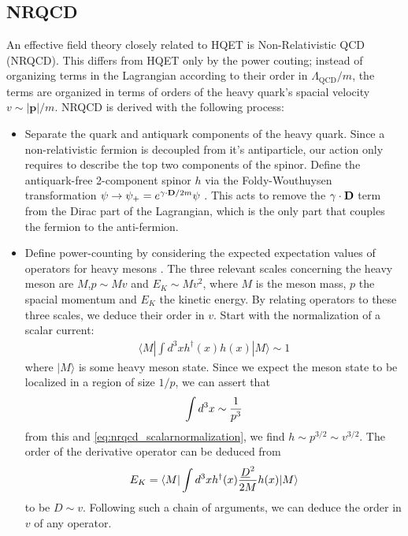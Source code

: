 \subsection{NRQCD}

An effective field theory closely related to HQET is Non-Relativistic QCD (NRQCD). This differs from HQET only by the power couting; instead of organizing terms in the Lagrangian according to their order in $\Lambda_{\text{QCD}}/m$, the terms are organized in terms of orders of the heavy quark's spacial velocity $v \sim |{\textbf{p}}|/m$. NRQCD is derived with the following process:
\begin{itemize}
\item
  Separate the quark and antiquark components of the heavy quark. Since a non-relativistic fermion is decoupled from it's antiparticle, our action only requires to describe the top two components of the spinor.
  Define the antiquark-free 2-component spinor $h$ via the Foldy-Wouthuysen transformation $\psi \to \psi_+ = e^{ {\bf{\gamma}}\cdot {\bf{D}}/2m} \psi$ \cite{PhysRev.78.29}. This acts to remove the ${\bf{\gamma}}\cdot {\bf{D}}$ term from the Dirac part of the Lagrangian, which is the only part that couples the fermion to the anti-fermion.
\item
Define power-counting by considering the expected expectation values of operators for heavy mesons \cite{Lepage:1992tx}. The three relevant scales concerning the heavy meson are $M$,$p\sim Mv$ and $E_K\sim Mv^2$, where $M$ is the meson mass, $p$ the spacial momentum and $E_K$ the kinetic energy. By relating operators to these three scales, we deduce their order in $v$. Start with the normalization of a scalar current:
\begin{align}
	\langle M | \int d^3x h^{\dagger}(x) h(x) | M \rangle \sim 1
	\label{eq:nrqcd_scalarnormalization}
\end{align}
where $| M \rangle$ is some heavy meson state. Since we expect the meson state to be localized in a region of size $1/p$, we can assert that
\begin{align}
	\int d^3x \sim {1\over p^3}
\end{align}
from this and \eqref{eq:nrqcd_scalarnormalization}, we find $h \sim p^{3/2} \sim v^{3/2}$. 
The order of the derivative operator can be deduced from
\begin{align}
	E_K = \langle M | \int d^3x h^{\dagger}(x) {\underline{D}^2\over 2M} h(x) | M \rangle
\end{align}
to be $D \sim v$. Following such a chain of arguments, we can deduce the order in $v$ of any operator.


\end{itemize}
